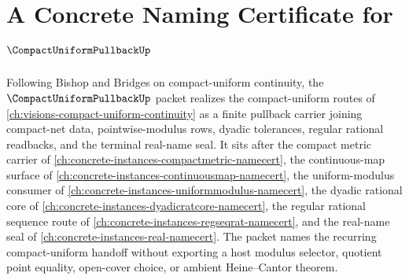 \chapter{A Concrete Naming Certificate for $\CompactUniformPullbackUp$}
\label{ch:concrete-instances-compact-uniform-pullback-namecert}

Following Bishop and Bridges on compact-uniform continuity, the $\CompactUniformPullbackUp$ packet realizes the compact-uniform routes of \autoref{ch:visions-compact-uniform-continuity} as a finite pullback carrier joining compact-net data, pointwise-modulus rows, dyadic tolerances, regular rational readbacks, and the terminal real-name seal. It sits after the compact metric carrier of \autoref{ch:concrete-instances-compactmetric-namecert}, the continuous-map surface of \autoref{ch:concrete-instances-continuousmap-namecert}, the uniform-modulus consumer of \autoref{ch:concrete-instances-uniformmodulus-namecert}, the dyadic rational core of \autoref{ch:concrete-instances-dyadicratcore-namecert}, the regular rational sequence route of \autoref{ch:concrete-instances-regseqrat-namecert}, and the real-name seal of \autoref{ch:concrete-instances-real-namecert}. The packet names the recurring compact-uniform handoff without exporting a host modulus selector, quotient point equality, open-cover choice, or ambient Heine--Cantor theorem.


